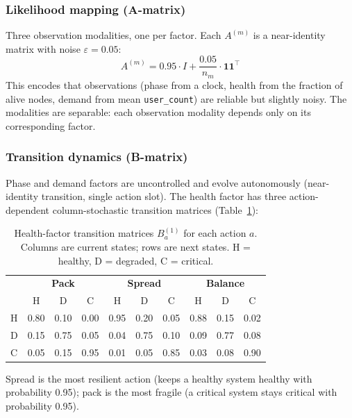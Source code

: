 \documentclass[11pt, a4paper]{article}
\begin{document}
\subsubsection{Likelihood mapping (\textbf{A}-matrix)}
Three observation modalities, one per factor.
Each $A^{(m)}$ is a near-identity matrix with noise $\varepsilon = 0.05$:
\begin{equation}
  A^{(m)} = 0.95 \cdot I + \frac{0.05}{n_m} \cdot \mathbf{1}\mathbf{1}^{\top}
\end{equation}
This encodes that observations (phase from a clock, health from the fraction of
alive nodes, demand from mean \texttt{user\_count}) are reliable but slightly
noisy.
The modalities are separable: each observation modality depends only on its
corresponding factor.

\subsubsection{Transition dynamics (\textbf{B}-matrix)}
Phase and demand factors are uncontrolled and evolve autonomously (near-identity
transition, single action slot).
The health factor has three action-dependent column-stochastic transition
matrices (Table~\ref{tab:b_health}):

\begin{table}[ht]
\centering
\caption{Health-factor transition matrices $B^{(1)}_a$ for each action $a$.
         Columns are current states; rows are next states.
         H = healthy, D = degraded, C = critical.}
\label{tab:b_health}
\begin{tabular}{lccc|ccc|ccc}
\toprule
 & \multicolumn{3}{c|}{\textbf{Pack}} & \multicolumn{3}{c|}{\textbf{Spread}}
 & \multicolumn{3}{c}{\textbf{Balance}} \\
 & H & D & C & H & D & C & H & D & C \\
\midrule
H & 0.80 & 0.10 & 0.00 & 0.95 & 0.20 & 0.05 & 0.88 & 0.15 & 0.02 \\
D & 0.15 & 0.75 & 0.05 & 0.04 & 0.75 & 0.10 & 0.09 & 0.77 & 0.08 \\
C & 0.05 & 0.15 & 0.95 & 0.01 & 0.05 & 0.85 & 0.03 & 0.08 & 0.90 \\
\bottomrule
\end{tabular}
\end{table}

Spread is the most resilient action (keeps a healthy system healthy with
probability 0.95); pack is the most fragile (a critical system stays critical
with probability 0.95).
\end{document}
